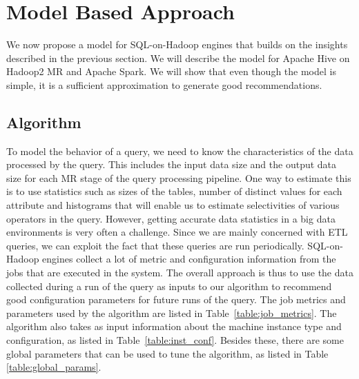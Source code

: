 \section{Model Based Approach}
\label{sec:modelbased}
We now propose a model for SQL-on-Hadoop engines that builds on the insights described in the previous section. We will describe the model for Apache Hive on Hadoop2 MR and Apache Spark. We will show that even though the model is simple, it is a sufficient approximation to generate good recommendations. 

\subsection{Algorithm}
To model the behavior of a query, we need to know the characteristics of the data processed by the query. This includes the input data size and the output data size for each MR stage of the query processing pipeline. One way to estimate this is to use statistics such as sizes of the tables, number of distinct values for each attribute and histograms that will enable us to estimate selectivities of various operators in the query. However, getting accurate data statistics in a big data environments is very often a challenge. Since we are mainly concerned with ETL queries, we can exploit the fact that these queries are run periodically. SQL-on-Hadoop engines collect a lot of metric and configuration information from the jobs that are executed in the system. The overall approach is thus to use the data collected during a run of the query as inputs to our algorithm to recommend good configuration parameters for future runs of the query. The job metrics and parameters used by the algorithm are listed in Table~\ref{table:job_metrics}. The algorithm also takes as input information about the machine instance type and configuration, as listed in Table~\ref{table:inst_conf}. Besides these, there are some global parameters that can be used to tune the algorithm, as listed in Table \ref{table:global_params}.


